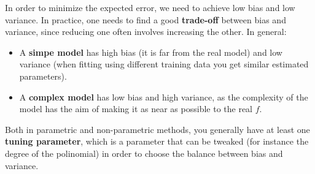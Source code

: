     In order to minimize the expected error, we need to achieve low bias and low
    variance. In practice, one needs to find a good \textbf{trade-off} between
    bias and variance, since reducing one often involves increasing the other.
    In general:
    \begin{itemize}
      \item A \textbf{simpe model} has high bias (it is far from the real model)
      and low variance (when fitting using different training data you get
      similar estimated parameters).
      \item A \textbf{complex model} has low bias and high variance, as the
      complexity of the model has the aim of making it as near as possible to
      the real $ f $.
    \end{itemize}
    Both in parametric and non-parametric methods, you generally have at least
    one \textbf{tuning parameter}, which is a parameter that can be tweaked (for
    instance the degree of the polinomial) in order to choose the balance
    between bias and variance.
   


